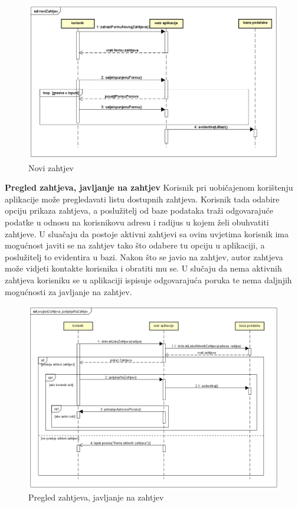				\newpage
				\begin{figure}[H]
					\includegraphics[scale=0.5]{slike/novi-zahtjev.png} %
					\centering
					\caption{Novi zahtjev}
				\end{figure}
				\newpage
				
				\noindent \large {\textbf{Pregled zahtjeva, javljanje na zahtjev}}
				\newline
				\noindent \normalsize Korisnik pri uobičajenom korištenju aplikacije može pregledavati listu dostupnih zahtjeva. Korisnik tada odabire opciju prikaza zahtjeva, a poslužitelj od baze podataka traži odgovarajuće podatke u odnosu na korisnikovu adresu i radijus u kojem želi obuhvatiti zahtjeve. U sluačaju da postoje aktivni zahtjevi sa ovim uvjetima korisnik ima mogućnost javiti se na zahtjev tako što odabere tu opciju u aplikaciji, a poslužitelj to evidentira u bazi. Nakon što se javio na zahtjev, autor zahtjeva može vidjeti kontakte korisnika i obratiti mu se. U slučaju da nema aktivnih zahtjeva korisniku se u aplikaciji ispisuje odgovarajuća poruka te nema daljnjih mogućnosti za javljanje na zahtjev. 
				   
				\newpage
				\begin{figure}[H]
					\includegraphics[scale=0.65]{slike/pregled-zahtjeva.png} %
					\centering
					\caption{Pregled zahtjeva, javljanje na zahtjev}
				\end{figure}
				\newpage
								
